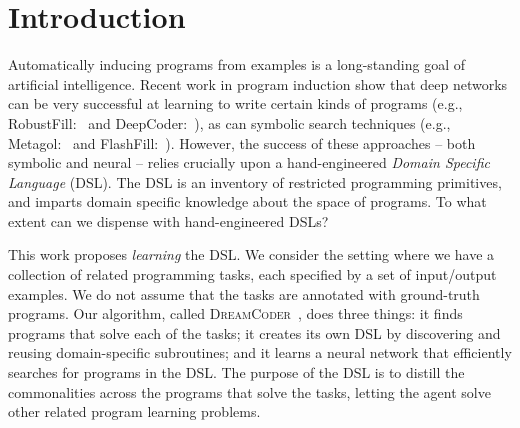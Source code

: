 \documentclass{article}
\newcommand{\system}{\textsc{DreamCoder}~}
\begin{document}
\printAffiliationsAndNotice{\icmlEqualContribution} %

\begin{abstract}

\end{abstract}

\section{Introduction}

Automatically inducing programs from examples is a long-standing goal
of artificial intelligence.  Recent work in program induction show
that deep networks can be very successful at learning to write certain
kinds of programs (e.g., RobustFill:~\cite{devlin2017robustfill} and
DeepCoder:~\cite{balog2016deepcoder}), as can symbolic search
techniques (e.g., Metagol:~\cite{muggleton2015meta} and 
FlashFill:~\cite{gulwani2011automating}).
However, the success of these approaches -- both symbolic and neural --
relies crucially upon a hand-engineered \emph{Domain Specific Language} (DSL).
The DSL is an inventory of restricted programming primitives,
and imparts domain specific knowledge about the space of programs.
To what extent can we dispense with hand-engineered DSLs?

This work proposes \emph{learning} the DSL.
We consider the setting where we have a collection of related programming tasks,
each specified by a set of input/output examples.
We do not assume that the tasks are annotated with
ground-truth programs.
Our algorithm, called \system,
does three things:
it finds programs that solve each of the tasks;
it creates its own DSL by discovering and reusing
domain-specific subroutines;
and it learns a neural network that
efficiently searches for programs in the DSL.
The purpose of the DSL
is to distill the commonalities across the programs that solve the tasks,
letting the agent solve other related program learning problems.








\end{document}
